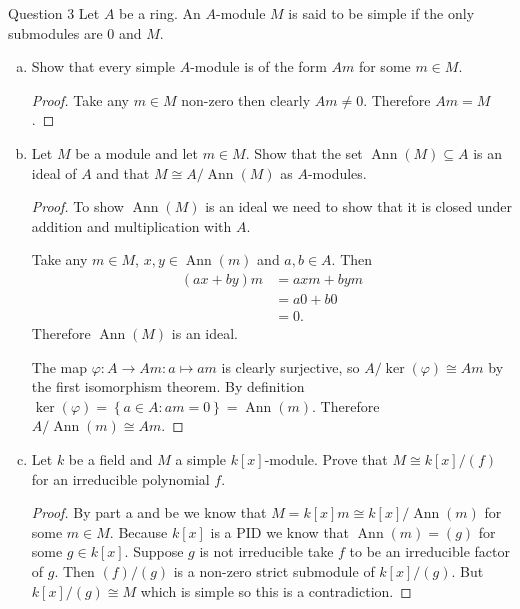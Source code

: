 \documentclass{article}
\newcommand{\setwith}[2]{\left\{#1:#2\right\}}
\DeclareMathOperator{\Ann}{Ann}
\newenvironment{question}[1][]{\begin{paragraph}{Question #1}}{\end{paragraph}}
\theoremstyle{definition}
\begin{document}
\begin{question}[3]
    Let \(A\) be a ring. An \(A\)-module \(M\) is said to be simple if the only
    submodules are \(0\) and \(M\).

    \begin{enumerate}[(a)]
        \item Show that every simple \(A\)-module is of the form \(Am\) for some
              \(m\in M\).

              \begin{proof}
                  Take any \(m\in M\) non-zero then clearly \(Am\neq 0\).
                  Therefore \(Am=M\).
              \end{proof}

        \item Let \(M\) be a module and let \(m\in M\). Show that the set
              \(\Ann(M)\subseteq A\) is an ideal of \(A\) and that \(M\cong
              A/\Ann(M)\) as \(A\)-modules.

              \begin{proof}
                  To show \(\Ann(M)\) is an ideal we need to show that it is
                  closed under addition and multiplication with \(A\).

                  Take any \(m\in M\), \(x,y\in\Ann(m)\) and \(a,b\in A\). Then
                  \begin{align*}
                      (ax+by)m & =axm+bym \\
                               & =a0+b0   \\
                               & =0.
                  \end{align*}
                  Therefore \(\Ann(M)\) is an ideal.

                  The map \(\varphi:A\to Am:a\mapsto am\) is clearly surjective,
                  so \(A/\ker(\varphi)\cong Am\) by the first isomorphism
                  theorem. By definition \(\ker(\varphi)=\setwith{a\in
                      A}{am=0}=\Ann(m)\). Therefore \(A/\Ann(m)\cong Am\).
              \end{proof}

        \item Let \(k\) be a field and \(M\) a simple \(k[x]\)-module. Prove
              that \(M\cong k[x]/(f)\) for an irreducible polynomial \(f\).

              \begin{proof}
                  By part a and be we know that \(M=k[x]m\cong k[x]/\Ann(m)\)
                  for some \(m\in M\). Because \(k[x]\) is a PID we know that
                  \(\Ann(m)=(g)\) for some \(g\in k[x]\). Suppose \(g\) is not
                  irreducible take \(f\) to be an irreducible factor of \(g\).
                  Then \((f)/(g)\) is a non-zero strict submodule of
                  \(k[x]/(g)\). But \(k[x]/(g)\cong M\) which is simple so this
                  is a contradiction.
              \end{proof}


\end{enumerate}
\end{question}
\end{document}
